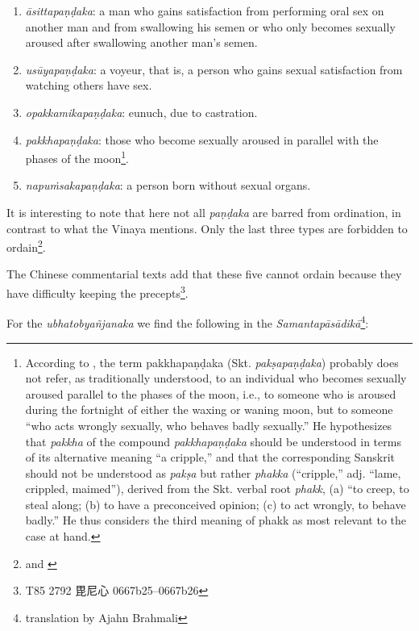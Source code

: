\begin{enumerate}
\item {\em āsittapaṇḍaka}: a man who gains satisfaction from performing oral sex on another man and from swallowing his semen or who only becomes sexually aroused after swallowing another man’s semen. 
\item {\em usūyapaṇḍaka}: a voyeur, that is, a person who gains sexual satisfaction from watching others have sex. 
\item {\em opakkamikapaṇḍaka}: eunuch, due to castration.
\item {\em pakkhapaṇḍaka}: those who become sexually aroused in parallel with the phases of the moon\footnote{According to \cite{bomhard}, the term pakkhapaṇḍaka (Skt. {\em pakṣapaṇḍaka}) probably does not refer, as traditionally understood, to an individual who becomes sexually aroused parallel to the phases of the moon, i.e., to someone who is aroused during the fortnight of either the waxing or waning moon, but to someone “who acts wrongly sexually, who behaves badly sexually.” He hypothesizes that {\em pakkha} of the compound {\em pakkhapaṇḍaka} should be understood in terms of its alternative meaning “a cripple,” and that the corresponding Sanskrit should not be understood as {\em pakṣa} but rather {\em phakka} (“cripple,” adj. “lame, crippled, maimed”), derived from the Skt. verbal root {\em phakk}, (a) “to creep, to steal along; (b) to have a preconceived opinion; (c) to act wrongly, to behave badly.” He thus considers the third meaning of phakk as most relevant to the case at hand.}.
\item {\em napuṁsakapaṇḍaka}: a person born without sexual organs. 
\end{enumerate}

It is interesting to note that here not all {\em paṇḍaka} are barred from ordination, in contrast to what the Vinaya mentions. Only the last three types are forbidden to ordain\footnote{\cite{wong} and \cite{thanissaro}}.

The Chinese commentarial texts add that these five cannot ordain because they have difficulty keeping the precepts\footnote{T85 2792 毘尼心 0667b25–0667b26}.

For the {\em ubhatob­yañ­janaka} we find the following in the {\em Samantapāsādikā}\footnote{translation by Ajahn Brahmali}:

